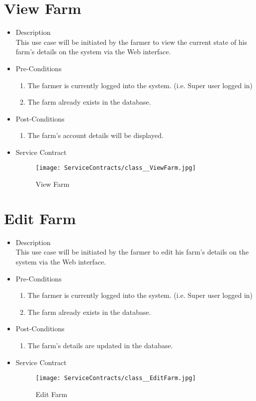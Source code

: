 \documentclass[11pt,fleqn]{book} %
\begin{document}
\section{View Farm}
\begin{itemize}
	\item Description\\
	This use case will be initiated by the farmer to view the current state of his farm’s details on the system via the Web interface.
	\item Pre-Conditions
	\begin{enumerate}
		\item The farmer is currently logged into the system. (i.e. Super user logged in)
		\item The farm already exists in the database.					
	\end{enumerate}
	\item Post-Conditions
	\begin{enumerate}
		\item The farm’s account details will be displayed.
	\end{enumerate}
	\item Service Contract
	\begin{figure}
		\texttt{[image: ServiceContracts/class\_\_ViewFarm.jpg]}
		\caption{View Farm}
	\end{figure}
\end{itemize}

\section{Edit Farm}
\begin{itemize}
	\item Description\\
	This use case will be initiated by the farmer to edit his farm’s details on the system via the Web interface.
	\item Pre-Conditions
	\begin{enumerate}
		\item The farmer is currently logged into the system. (i.e. Super user logged in)
		\item The farm already exists in the database.					
	\end{enumerate}
	\item Post-Conditions
	\begin{enumerate}
		\item The farm’s details are updated in the database.
	\end{enumerate}
	\item Service Contract
	\begin{figure}
		\texttt{[image: ServiceContracts/class\_\_EditFarm.jpg]}
		\caption{Edit Farm}
	\end{figure}
\end{itemize}
\end{document}
